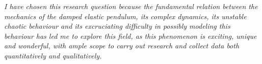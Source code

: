 \textit{I have chosen this research question because the fundamental relation between the mechanics of the damped elastic pendulum, its complex dynamics, its unstable chaotic behaviour and its excruciating difficulty in possibly modeling this behaviour has led me to explore this field, as this phenomenon is exciting, unique and wonderful, with ample scope to carry out research and collect data both quantitatively and qualitatively.}

